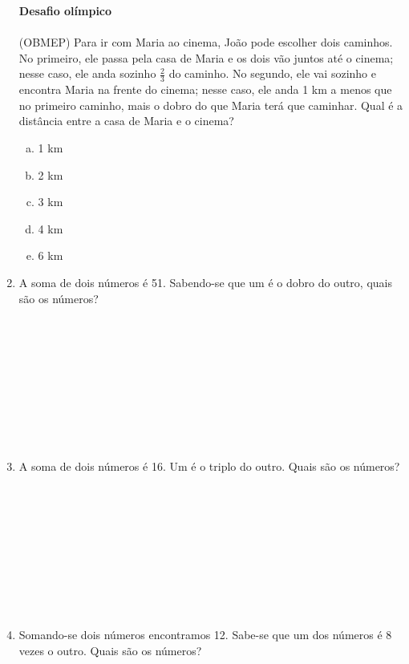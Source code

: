 \documentclass[a4paper,14pt]{article}
\begin{document}
\begin{multicols}{2}
\begin{enumerate}
			\textbf{Desafio olímpico} \\\\
			(OBMEP) Para ir com Maria ao cinema, João pode escolher dois caminhos. No primeiro, ele passa pela casa de Maria e os dois vão juntos até o cinema; nesse caso, ele anda sozinho $\frac{2}{3}$ do caminho. No segundo, ele vai sozinho e encontra Maria na frente do cinema; nesse caso, ele anda 1 km a menos que no primeiro caminho, mais o dobro do que Maria terá que caminhar. Qual é a distância entre a casa de Maria e o cinema? \\
			\begin{enumerate}[a)]
				\item 1 km
				\item 2 km
				\item 3 km
				\item 4 km
				\item 6 km \newpage
			\end{enumerate}
			\item A soma de dois números é 51. Sabendo-se que um é o dobro do outro, quais são os números? \\\\\\\\\\\\\\\\\\\\
			\item A soma de dois números é 16. Um é o triplo do outro. Quais são os números? \\\\\\\\\\\\\\\\\\\\
			\item Somando-se dois números encontramos 12. Sabe-se que um dos números é 8 vezes o outro. Quais são os números? \\\\\\\\\\\\\\\\\\\\

\end{enumerate}
\end{multicols}
\end{document}
